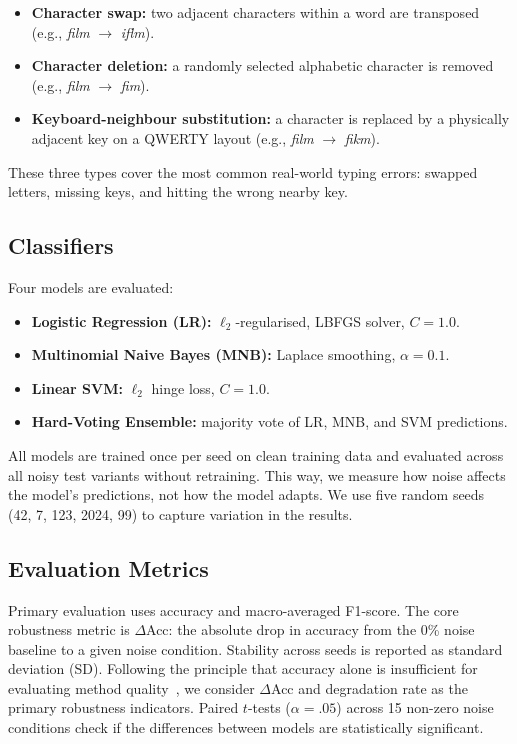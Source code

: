 \documentclass[sigconf]{acmart}
\begin{document}
\begin{itemize}
  \item \textbf{Character swap:} two adjacent characters within a word are
    transposed (e.g., \textit{film} $\to$ \textit{iflm}).
  \item \textbf{Character deletion:} a randomly selected alphabetic character
    is removed (e.g., \textit{film} $\to$ \textit{fim}).
  \item \textbf{Keyboard-neighbour substitution:} a character is replaced by a
    physically adjacent key on a QWERTY layout (e.g., \textit{film} $\to$
    \textit{fikm}).
\end{itemize}

These three types cover the most common real-world typing errors: swapped
letters, missing keys, and hitting the wrong nearby key.

\subsection{Classifiers}
Four models are evaluated:

\begin{itemize}
  \item \textbf{Logistic Regression (LR):} $\ell_2$-regularised, LBFGS
    solver, $C = 1.0$.
  \item \textbf{Multinomial Naive Bayes (MNB):} Laplace smoothing,
    $\alpha = 0.1$.
  \item \textbf{Linear SVM:} $\ell_2$ hinge loss, $C = 1.0$.
  \item \textbf{Hard-Voting Ensemble:} majority vote of LR, MNB, and SVM
    predictions.
\end{itemize}

All models are trained once per seed on clean training data and evaluated
across all noisy test variants without retraining. This way, we measure how
noise affects the model's predictions, not how the model adapts. We use five
random seeds (42, 7, 123, 2024, 99) to capture variation in the results.

\subsection{Evaluation Metrics}
Primary evaluation uses accuracy and macro-averaged F1-score. The core
robustness metric is $\Delta$Acc: the absolute drop in accuracy from the 0\%
noise baseline to a given noise condition. Stability across seeds is reported
as standard deviation (SD). Following the principle that accuracy alone is
insufficient for evaluating method quality~\cite{tumula2024}, we consider
$\Delta$Acc and degradation rate as the primary robustness indicators. Paired
$t$-tests ($\alpha = .05$) across 15 non-zero noise conditions check if the
differences between models are statistically significant.
\end{document}
